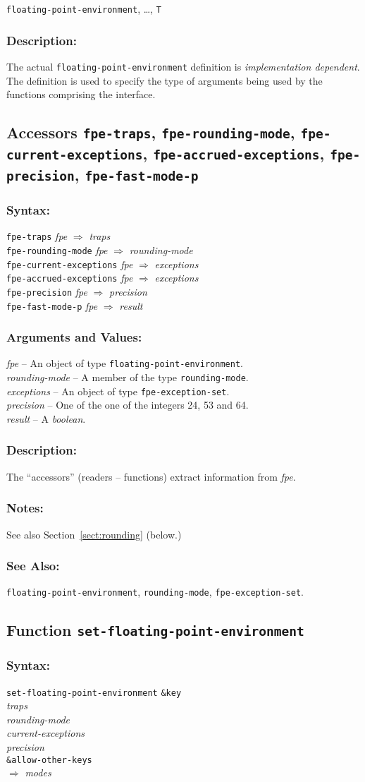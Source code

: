 \documentclass[10pt,fleqn]{article}
\newcommand{\code}[1]{\texttt{#1}}
\newcommand{\varname}[1]{\textit{#1}}
\newcommand{\DDictionaryItem}[1]{\vspace*{6pt}\noindent\hrulefill\vspace*{-9pt}\subsection*{#1}}
\newcommand{\DSyntax}{\subsubsection*{Syntax:}}
\newcommand{\DArgsNValues}{\subsubsection*{Arguments and Values:}}
\newcommand{\DDescription}{\subsubsection*{Description:}}
\newcommand{\DNotes}{\subsubsection*{Notes:}}
\newcommand{\DSeeAlso}{\subsubsection*{See Also:}}
\begin{document}
\code{floating-point-environment}, \ldots, \code{T}

\DDescription{}

The actual \code{floating-point-environment} definition is
\emph{implementation dependent}.  The definition is used to specify
the type of arguments being used by the functions comprising the
interface.


\DDictionaryItem{Accessors \code{fpe-traps}, \code{fpe-rounding-mode},
  \code{fpe-current-exceptions}, \code{fpe-accrued-exceptions},
  \code{fpe-precision}, \code{fpe-fast-mode-p}}

\DSyntax{}

\code{fpe-traps} \varname{fpe} $\Rightarrow$ \varname{traps}\\
\code{fpe-rounding-mode} \varname{fpe} $\Rightarrow$ \varname{rounding-mode}\\
\code{fpe-current-exceptions} \varname{fpe} $\Rightarrow$ \varname{exceptions}\\
\code{fpe-accrued-exceptions} \varname{fpe} $\Rightarrow$ \varname{exceptions}\\
\code{fpe-precision} \varname{fpe} $\Rightarrow$ \varname{precision}\\
\code{fpe-fast-mode-p} \varname{fpe} $\Rightarrow$ \varname{result}

\DArgsNValues{}

\varname{fpe} -- An object of type \code{floating-point-environment}.\\
\varname{rounding-mode} -- A member of the type \code{rounding-mode}.\\
\varname{exceptions} -- An object of type \code{fpe-exception-set}.\\
\varname{precision} -- One of the one of the integers 24, 53 and 64.\\
\varname{result} -- A \emph{boolean}.

\DDescription{}

The ``accessors'' (readers -- functions) extract information from
\varname{fpe}.


\DNotes{}

See also Section~\ref{sect:rounding} (below.)

\DSeeAlso{}

\code{floating-point-environment}, \code{rounding-mode},
\code{fpe-exception-set}. 


\DDictionaryItem{Function \code{set-floating-point-environment}}

\DSyntax{}

\begin{tabbing}
\code{set-floating-point-environment} \= \code{\&key}\\
\>\varname{traps}\\
\>\varname{rounding-mode}\\
\>\varname{current-exceptions}\\
\>\varname{precision}\\
\>\code{\&allow-other-keys}\\
$\Rightarrow$ \varname{modes}
\end{tabbing}
\end{document}
